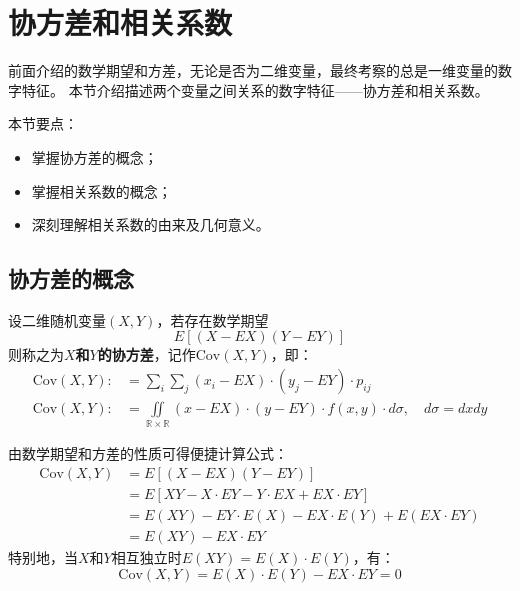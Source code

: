 \section{协方差和相关系数}

前面介绍的数学期望和方差，无论是否为二维变量，最终考察的总是一维变量的数字特征。
本节介绍描述两个变量之间关系的数字特征——协方差和相关系数。

本节要点：
\begin{itemize}
    \item 掌握协方差的概念；
    \item 掌握相关系数的概念；
    \item 深刻理解相关系数的由来及几何意义。
\end{itemize}

\subsection{协方差的概念}

\begin{definition}[协方差]
设二维随机变量$\left( X,Y \right) $，若存在数学期望
\[
E\left[ \left( X-EX \right) \left( Y-EY \right) \right]
\]
则称之为{\bf $X$和$Y$的协方差}，记作$\mathrm{Cov}\left( X,Y \right) $，即：
\begin{align*}
\mathrm{Cov}\left( X,Y \right) :&=\sum_i{\sum_j{\left( x_i-EX \right) \cdot \left( y_j-EY \right) \cdot p_{ij}}} \\
\mathrm{Cov}\left( X,Y \right) :&=\iint\limits_{\mathbb{R} \times \mathbb{R}}{\left( x-EX \right) \cdot \left( y-EY \right) \cdot f\left( x,y \right) \cdot d\sigma}, \quad d\sigma =dxdy
\end{align*}
\end{definition}

由数学期望和方差的性质可得便捷计算公式：
\begin{align*}
\mathrm{Cov}\left( X,Y \right) &=E\left[ \left( X-EX \right) \left( Y-EY \right) \right] \\
&=E\left[ XY-X\cdot EY-Y\cdot EX+EX\cdot EY \right] \\
&=E\left( XY \right) -EY\cdot E\left( X \right) -EX\cdot E\left( Y \right) +E\left( EX\cdot EY \right) \\
&=E\left( XY \right) -EX\cdot EY
\end{align*}
特别地，当$X$和$Y$相互独立时$E\left( XY \right) =E\left( X \right) \cdot E\left( Y \right) $，有：
\[
\mathrm{Cov}\left( X,Y \right) =E\left( X \right) \cdot E\left( Y \right) -EX\cdot EY=0
\]

